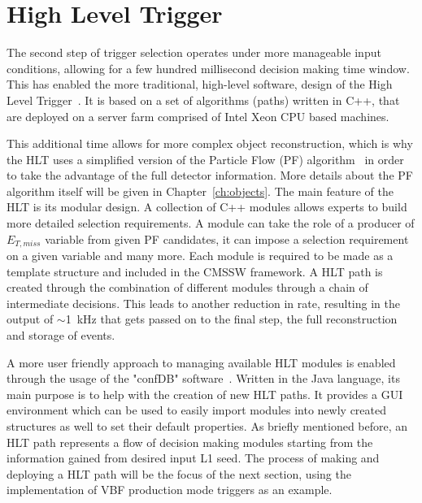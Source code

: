 \section{High Level Trigger}

\hspace{10pt} The second step of trigger selection operates under more manageable input conditions, allowing for a few hundred millisecond decision making time window. This has enabled the more traditional, high-level software, design of the High Level Trigger~\cite{HLT_performance}. It is based on a set of algorithms (paths) written in C++, that are deployed on a server farm comprised of Intel Xeon CPU based machines.

\hspace{10pt} This additional time allows for more complex object reconstruction, which is why the HLT uses a simplified version of the Particle Flow (PF) algorithm~\cite{PF:Florian} in order to take the advantage of the full detector information. More details about the PF algorithm itself will be given in Chapter~\ref{ch:objects}. The main feature of the HLT is its modular design. A collection of C++ modules allows experts to build more detailed selection requirements. A module can take the role of a producer of $E_{T,miss}$ variable from given PF candidates, it can impose a selection requirement on a given variable and many more. Each module is required to be made as a template structure and included in the CMSSW framework. A HLT path is created through the combination of different modules through a chain of intermediate decisions. This leads to another reduction in rate, resulting in the output of $\sim$1~kHz that gets passed on to the final step, the full reconstruction and storage of events.

\hspace{10pt} A more user friendly approach to managing available HLT modules is enabled through the usage of the "confDB" software~\cite{confdb}. Written in the Java language, its main purpose is to help with the creation of new HLT paths. It provides a GUI environment which can be used to easily import modules into newly created structures as well to set their default properties. As briefly mentioned before, an HLT path represents a flow of decision making modules starting from the information gained from desired input L1 seed. The process of making and deploying a HLT path will be the focus of the next section, using the implementation of VBF production mode triggers as an example.

